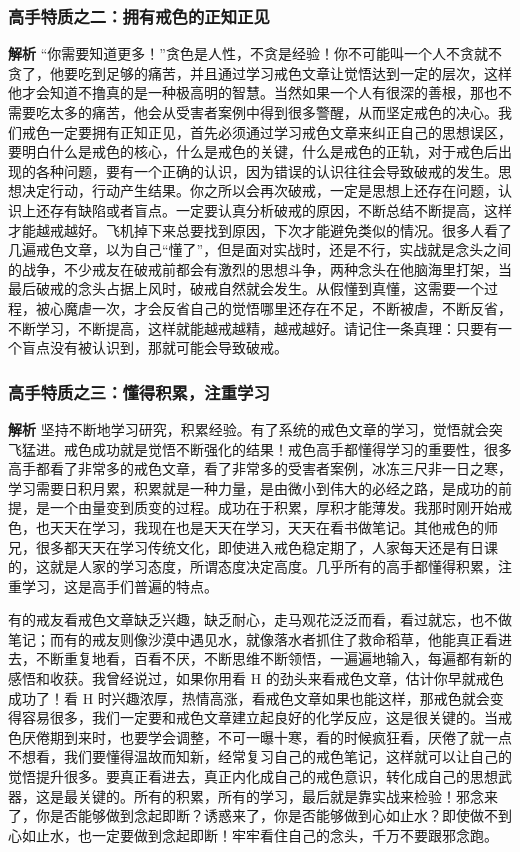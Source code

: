 \subsubsection{高手特质之二：拥有戒色的正知正见}

\textbf{解析} “你需要知道更多！”贪色是人性，不贪是经验！你不可能叫一个人不贪就不贪了，他要吃到足够的痛苦，并且通过学习戒色文章让觉悟达到一定的层次，这样他才会知道不撸真的是一种极高明的智慧。当然如果一个人有很深的善根，那也不需要吃太多的痛苦，他会从受害者案例中得到很多警醒，从而坚定戒色的决心。我们戒色一定要拥有正知正见，首先必须通过学习戒色文章来纠正自己的思想误区，要明白什么是戒色的核心，什么是戒色的关键，什么是戒色的正轨，对于戒色后出现的各种问题，要有一个正确的认识，因为错误的认识往往会导致破戒的发生。思想决定行动，行动产生结果。你之所以会再次破戒，一定是思想上还存在问题，认识上还存有缺陷或者盲点。一定要认真分析破戒的原因，不断总结不断提高，这样才能越戒越好。飞机掉下来总要找到原因，下次才能避免类似的情况。很多人看了几遍戒色文章，以为自己“懂了”，但是面对实战时，还是不行，实战就是念头之间的战争，不少戒友在破戒前都会有激烈的思想斗争，两种念头在他脑海里打架，当最后破戒的念头占据上风时，破戒自然就会发生。从假懂到真懂，这需要一个过程，被心魔虐一次，才会反省自己的觉悟哪里还存在不足，不断被虐，不断反省，不断学习，不断提高，这样就能越戒越精，越戒越好。请记住一条真理：只要有一个盲点没有被认识到，那就可能会导致破戒。

\subsubsection{高手特质之三：懂得积累，注重学习}

\textbf{解析} 坚持不断地学习研究，积累经验。有了系统的戒色文章的学习，觉悟就会突飞猛进。戒色成功就是觉悟不断强化的结果！戒色高手都懂得学习的重要性，很多高手都看了非常多的戒色文章，看了非常多的受害者案例，冰冻三尺非一日之寒，学习需要日积月累，积累就是一种力量，是由微小到伟大的必经之路，是成功的前提，是一个由量变到质变的过程。成功在于积累，厚积才能薄发。我那时刚开始戒色，也天天在学习，我现在也是天天在学习，天天在看书做笔记。其他戒色的师兄，很多都天天在学习传统文化，即使进入戒色稳定期了，人家每天还是有日课的，这就是人家的学习态度，所谓态度决定高度。几乎所有的高手都懂得积累，注重学习，这是高手们普遍的特点。

有的戒友看戒色文章缺乏兴趣，缺乏耐心，走马观花泛泛而看，看过就忘，也不做笔记；而有的戒友则像沙漠中遇见水，就像落水者抓住了救命稻草，他能真正看进去，不断重复地看，百看不厌，不断思维不断领悟，一遍遍地输入，每遍都有新的感悟和收获。我曾经说过，如果你用看 H 的劲头来看戒色文章，估计你早就戒色成功了！看 H 时兴趣浓厚，热情高涨，看戒色文章如果也能这样，那戒色就会变得容易很多，我们一定要和戒色文章建立起良好的化学反应，这是很关键的。当戒色厌倦期到来时，也要学会调整，不可一曝十寒，看的时候疯狂看，厌倦了就一点不想看，我们要懂得温故而知新，经常复习自己的戒色笔记，这样就可以让自己的觉悟提升很多。要真正看进去，真正内化成自己的戒色意识，转化成自己的思想武器，这是最关键的。所有的积累，所有的学习，最后就是靠实战来检验！邪念来了，你是否能够做到念起即断？诱惑来了，你是否能够做到心如止水？即使做不到心如止水，也一定要做到念起即断！牢牢看住自己的念头，千万不要跟邪念跑。

